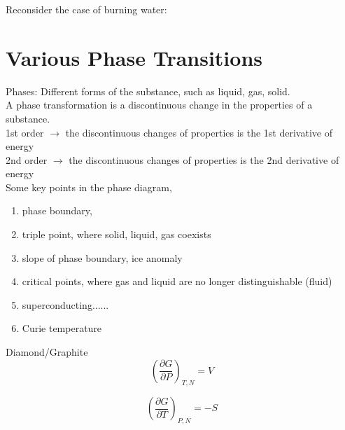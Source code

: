 Reconsider the case of burning water:~~~~~~~\\

\section{Various Phase Transitions}
Phases: Different forms of the substance, such as liquid, gas, solid.\\
A phase transformation is a discontinuous change in the properties of a substance.\\
1st order $\rightarrow$ the discontinuous changes of properties is the 1st derivative of energy\\
2nd order $\rightarrow$ the discontinuous changes of properties is the 2nd derivative of energy\\
Some key points in the phase diagram,
\begin{enumerate}
\item phase boundary, 
\item triple point, where solid, liquid, gas coexists
\item slope of phase boundary, ice anomaly
\item critical points, where gas and liquid are no longer distinguishable (fluid)
\item superconducting......
\item Curie temperature
\end{enumerate}

Diamond/Graphite
\begin{equation} 
(\frac{\partial G}{\partial P})_{T,N} = V
\end{equation}

\begin{equation} 
(\frac{\partial G}{\partial T})_{P,N} = -S
\end{equation}



